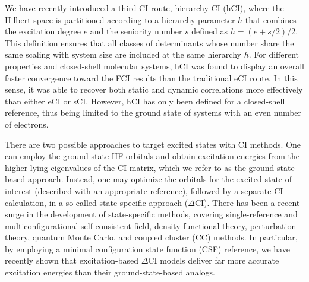 \documentclass[aip,jcp,reprint,noshowkeys,superscriptaddress]{revtex4-1}
\begin{document}
We have recently introduced a third CI route, hierarchy CI (hCI), \cite{Kossoski_2022}
where the Hilbert space is partitioned according to a hierarchy parameter $h$ that combines the excitation degree $e$ and the seniority number $s$ defined as $h = (e+s/2)/2$.
This definition ensures that all classes of determinants whose number share the same scaling with system size are included at the same hierarchy $h$.
For different properties and closed-shell molecular systems,
hCI was found to display an overall faster convergence toward the FCI results than the traditional eCI route. \cite{Kossoski_2022}
In this sense, it was able to recover both static and dynamic correlations more effectively than either eCI or sCI.
However, hCI has only been defined for a closed-shell reference, thus being limited to the ground state of systems with an even number of electrons.

There are two possible approaches to target excited states with CI methods.
One can employ the ground-state HF orbitals and obtain excitation energies from the higher-lying eigenvalues of the CI matrix, which we refer to as the ground-state-based approach.
Instead, one may optimize the orbitals for the excited state of interest (described with an appropriate reference), followed by a separate CI calculation,
in a so-called state-specific approach ($\Delta$CI).
There has been a recent surge in the development of state-specific methods, covering
single-reference and multiconfigurational self-consistent field,
\cite{Ziegler_1977,Burton_2021,Shea_2018,Tran_2019,Tran_2020,Hardikar_2020,Shea_2020,Burton_2021,Burton_2022,Hanscam_2022,Kossoski_2023,Marie_2023,Tran_2023}
density-functional theory,
\cite{Filatov_1999,Kowalczyk_2011,Kowalczyk_2013,Gilbert_2008,Barca_2018,Hait_2020,Hait_2021,Zhao_2020,Levi_2020,Carter-Fenk_2020,Toffoli_2022,Schmerwitz_2022,Schmerwitz_2023}
perturbation theory, \cite{Clune_2020,Zhao_2020b,Clune_2023}
quantum Monte Carlo, \cite{Scemama_2018a,Scemama_2018b,Dash_2018,Dash_2019,Dash_2021,Cuzzocrea_2022,Shepard_2022,Otis_2020,Otis_2023}
and coupled cluster (CC)
\cite{Piecuch_2000,Mayhall_2010,Lee_2019,Kossoski_2021,Marie_2021,Rishi_2023,Tuckman_2023}
methods.
In particular, by employing a minimal configuration state function (CSF) reference,
we have recently shown that excitation-based $\Delta$CI models deliver far more accurate excitation energies than their ground-state-based analogs. \cite{Kossoski_2023}
\end{document}
